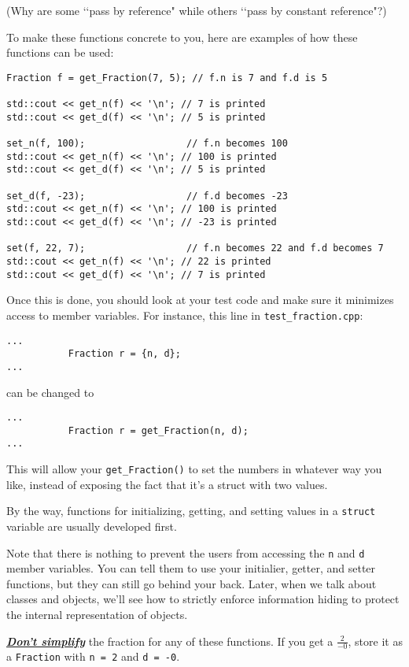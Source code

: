 (Why are some \lq\lq pass by reference" while others \lq\lq pass by constant
reference"?)

To make these functions concrete to you, here are examples of how these
functions can be used:
\begin{Verbatim}[frame=single]
Fraction f = get_Fraction(7, 5); // f.n is 7 and f.d is 5

std::cout << get_n(f) << '\n'; // 7 is printed
std::cout << get_d(f) << '\n'; // 5 is printed

set_n(f, 100);                  // f.n becomes 100
std::cout << get_n(f) << '\n'; // 100 is printed
std::cout << get_d(f) << '\n'; // 5 is printed

set_d(f, -23);                  // f.d becomes -23
std::cout << get_n(f) << '\n'; // 100 is printed
std::cout << get_d(f) << '\n'; // -23 is printed

set(f, 22, 7);                  // f.n becomes 22 and f.d becomes 7
std::cout << get_n(f) << '\n'; // 22 is printed
std::cout << get_d(f) << '\n'; // 7 is printed
\end{Verbatim}

Once this is done, you should look at your test code and make sure it minimizes
access to member variables. For instance, this line in
\verb!test_fraction.cpp!:
\begin{Verbatim}[frame=single]
...
           Fraction r = {n, d};
...
\end{Verbatim}
can be changed to
\begin{Verbatim}[frame=single]
...
           Fraction r = get_Fraction(n, d);
...
\end{Verbatim}

This will allow your \verb!get_Fraction()! to set the numbers in whatever way
you like, instead of exposing the fact that it's a struct with two values.

By the way, functions for initializing, getting, and setting values in a
\verb!struct! variable are usually developed first.

Note that there is nothing to prevent the users from accessing the \verb!n!
and \verb!d! member variables. You can tell them to use your initialier,
getter, and setter functions, but they can still go behind your back. Later,
when we talk about classes and objects, we'll see how to strictly enforce
information hiding to protect the internal representation of objects.

\underline{\textit{\textbf{Don't simplify}}}
the fraction for any of these functions. If you get a
$\frac{2}{-0}$, store it as a \verb!Fraction! with \verb!n = 2! and
\verb!d = -0!.
